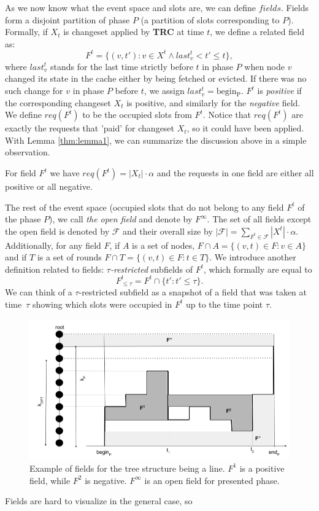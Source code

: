 As we now know what the event space and slots are, we can define $fields$.
Fields form a disjoint partition of phase $P$ (a partition of slots corresponding to
$P$). Formally, if $X_t$ is changeset applied by \textbf{TRC} at time $t$, we
define a related field as: $$F^t = \{(v, t'): v \in X^t \wedge last_v^t < t' \leq
t\},$$ where $last_v^{t}$ stands for the last time strictly before $t$ in
phase $P$ when node $v$ changed its state in the cache either by being fetched
or evicted. If there was no such change for $v$ in phase $P$ before $t$, we
assign $last_v^{t} = \mathrm{begin_P}$. $F^t$ is \textit{positive} if the
corresponding changeset $X_t$ is positive, and similarly for the \textit{negative}
field. We define $req(F^t)$ to be the occupied slots from $F^t$. Notice that
$req(F^t)$ are exactly the requests that 'paid' for changeset $X_t$, so it could
have been applied. With Lemma \ref{thm:lemma1}, we can summarize the discussion
above in a simple observation.  \begin{observe} For field $F^t$ we have
$req(F^t) = |X_t| \cdot \alpha$ and the requests in one field are either all
positive or all negative.  \label{obs:observe1} \end{observe} The rest of the
event space (occupied slots that do not belong to any field $F^t$ of the phase
$P$), we call \textit{the open field} and denote by $F^{\infty}$. The set of all fields
except the open field is denoted by $\mathcal{F}$ and their overall size by
$|\mathcal{F}| = \sum_{F^t \in \mathcal{F}} |X^t| \cdot \alpha$.  Additionally,
for any field $F$, if $A$ is a set of nodes, $F \cap A = \{(v,t) \in F: v \in
A\}$ and if $T$ is a set of rounds $F \cap T = \{(v, t) \in F: t \in T\}$. We
introduce another definition related to fields: $\tau$\textit{-restricted}
subfields of $F^t$, which formally are equal to $$F^t_{\leq \tau} = F^t \cap \{t':
t' \leq \tau\}.$$ We can think of a $\tau$-restricted subfield as a snapshot of
a field that was taken at time~$\tau$ showing which slots were occupied in $F^t$
up to the time point $\tau$.  \begin{figure} \begin{center}
\includegraphics[width=1.1\textwidth]{fields.png} \end{center} \caption{Example
of fields for the tree structure being a line. $F^1$ is a positive field, while $F^2$
is negative. $F^{\infty}$ is an open field for presented phase.}
\label{fig:fields} \end{figure} Fields are hard to visualize in the general case, so
